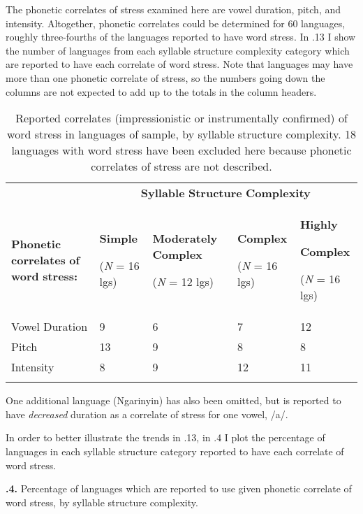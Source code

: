   The phonetic correlates of stress examined here are vowel duration, pitch, and intensity. Altogether, phonetic correlates could be determined for 60 languages, roughly three-fourths of the languages reported to have word stress. In .13 I show the number of languages from each syllable structure complexity category which are reported to have each correlate of word stress. Note that languages may have more than one phonetic correlate of stress, so the numbers going down the columns are not expected to add up to the totals in the column headers.

\begin{table}
\begin{tabularx}{\textwidth}{XXXXX}
\lsptoprule
 & \multicolumn{4}{c}{ \textbf{Syllable} \textbf{Structure} \textbf{Complexity}}\\
 \textbf{Phonetic} \textbf{correlates} \textbf{of} \textbf{word} \textbf{stress:} & { \textbf{Simple}}

 (\textit{N} = 16 lgs) & { \textbf{Moderately} \textbf{Complex}}

 (\textit{N} = 12 lgs) & { \textbf{Complex}}

 (\textit{N} = 16 lgs) & { \textbf{Highly} }

{ \textbf{Complex}}

 (\textit{N} = 16 lgs)\\
 Vowel Duration & 9 & 6 & 7 & 12\\
 Pitch & 13 & 9 & 8 & 8\\
 Intensity & 8 & 9 & 12 & 11\\
\lspbottomrule
\end{tabularx}
\caption{\label{5.13}Reported correlates (impressionistic or instrumentally confirmed) of word stress in languages of sample, by syllable structure complexity. 18 languages with word stress have been excluded here because phonetic correlates of stress are not described.}One additional language (Ngarinyin) has also been omitted, but is reported to have \textit{decreased} duration as a correlate of stress for one vowel, /a/.
\end{table}

  In order to better illustrate the trends in .13, in .4 I plot the percentage of languages in each syllable structure category reported to have each correlate of word stress.

\textbf{.4.} Percentage of languages which are reported to use given phonetic correlate of word stress, by syllable structure complexity.

